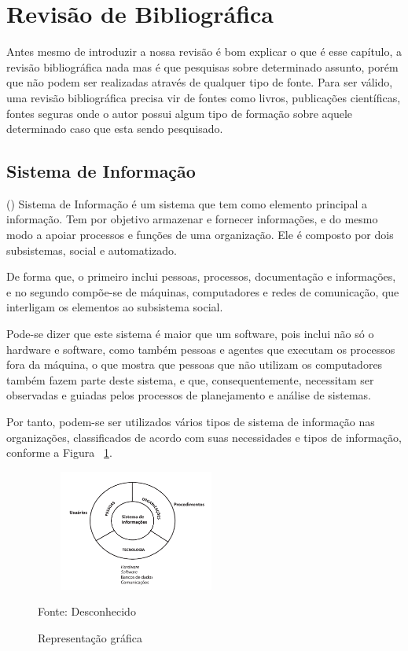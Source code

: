 \section{Revisão de Bibliográfica}
\vspace*{1cm}
Antes mesmo de introduzir a nossa revisão é bom explicar o que é esse capítulo, a revisão bibliográfica nada mas é que pesquisas sobre determinado assunto, porém que não podem ser realizadas através de qualquer tipo de fonte. Para ser válido, uma
revisão bibliográfica precisa vir de fontes como livros, publicações científicas, fontes seguras onde o autor possui algum tipo de formação sobre aquele determinado
caso que esta sendo pesquisado.

\subsection{Sistema de Informação}

(\cite{conceito}) Sistema de Informação é um sistema que tem como elemento principal a informação. Tem por objetivo armazenar e fornecer informações, e do mesmo modo a apoiar processos e funções de uma organização. 
Ele é composto por dois subsistemas, social e automatizado.

De forma que, o primeiro inclui pessoas, processos, documentação e informações, e no segundo compõe-se de máquinas, computadores e redes de comunicação, que interligam os elementos ao subsistema social. 

Pode-se dizer que este sistema é maior que um software, pois inclui não só o hardware e software, como também pessoas e agentes que executam os processos fora da máquina, o que mostra que pessoas que não utilizam os computadores também fazem parte deste sistema, e que, consequentemente, necessitam ser observadas e guiadas pelos processos de planejamento e análise de sistemas. 

Por tanto, podem-se ser utilizados vários tipos de sistema de informação nas organizações, classificados de acordo com suas necessidades e tipos de informação, conforme a Figura~ \hypersetup{linkcolor=black}\ref{fig:Figura}.

 \begin{figure}[!h]
	\centering
	\caption{Representação gráfica}
	\includegraphics[width=250px, height=150px]{./images/2-1.png}
	\label{fig:Figura}
	\par{Fonte: Desconhecido}
\end{figure}
\newpage


